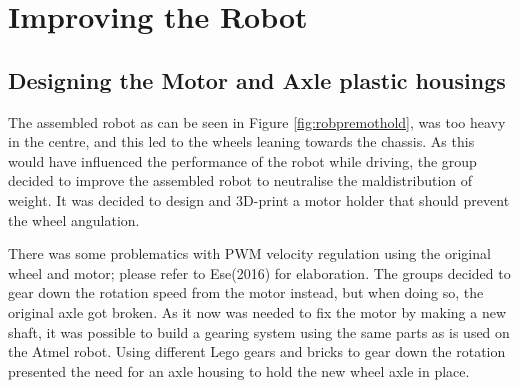 \section{Improving the Robot}
\label{sec:improvements}

\subsection{Designing the Motor and Axle plastic housings}
The assembled robot as can be seen in Figure \ref{fig:robpremothold}, was too heavy in the centre, and this led to the wheels leaning towards the chassis. As this would have influenced the performance of the robot while driving, the group decided to improve the assembled robot to neutralise the maldistribution of weight. It was decided to design and 3D-print a motor holder that should prevent the wheel angulation.

There was some problematics with PWM velocity regulation using the original wheel and motor; please refer to Ese(2016) for elaboration. The groups decided to gear down the rotation speed from the motor instead, but when doing so, the original axle got broken. As it now was needed to fix the motor by making a new shaft, it was possible to build a gearing system using the same parts as is used on the Atmel robot. Using different Lego gears and bricks to gear down the rotation presented the need for an axle housing to hold the new wheel axle in place.

